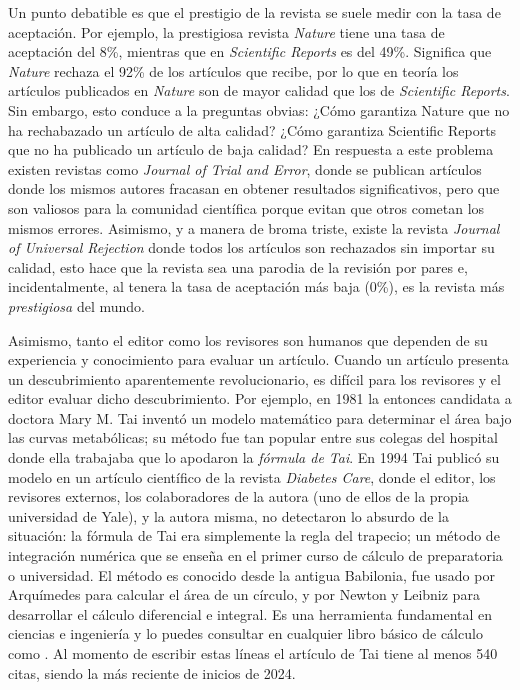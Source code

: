 Un punto debatible es que el prestigio de la revista se suele medir con la tasa
de aceptación.
Por ejemplo, la prestigiosa revista \emph{Nature} tiene una tasa de aceptación
del 8\%, mientras que en \emph{Scientific Reports} es del 49\%.
Significa que \emph{Nature} rechaza el 92\% de los artículos que recibe, por lo
que en teoría los artículos publicados en \emph{Nature} son de mayor calidad que
los de \emph{Scientific Reports}.
Sin embargo, esto conduce a la preguntas obvias:
¿Cómo garantiza Nature que no ha rechabazado un artículo de alta calidad?
¿Cómo garantiza Scientific Reports que no ha publicado un artículo de baja
calidad?
En respuesta a este problema existen revistas como \emph{Journal of Trial and
    Error}, donde se publican
artículos donde los mismos autores fracasan en obtener resultados
significativos, pero que son valiosos para la comunidad científica porque evitan
que otros cometan los mismos errores.
Asimismo, y a manera de broma triste, existe la revista \emph{Journal of
    Universal Rejection} donde todos
los artículos son rechazados sin importar su calidad, esto hace que la revista
sea una parodia de la revisión por pares e, incidentalmente, al tenera la tasa
de aceptación más baja (0\%), es la revista más \emph{prestigiosa} del mundo.

Asimismo, tanto el editor como los revisores son humanos que dependen de su
experiencia y conocimiento para evaluar un artículo.
Cuando un artículo presenta un descubrimiento aparentemente revolucionario, es
difícil para los revisores y el editor evaluar dicho descubrimiento.
Por ejemplo, en 1981 la entonces candidata a doctora Mary M. Tai inventó un
modelo matemático para determinar el área bajo las curvas metabólicas; su método
fue tan popular entre sus colegas del hospital donde ella trabajaba que lo
apodaron la \emph{fórmula de Tai}.
En 1994 Tai publicó su modelo en un artículo científico de la revista
\emph{Diabetes Care}\cite{Tai1994}, donde el editor, los revisores externos,
los colaboradores de la autora (uno de ellos de la propia universidad de Yale),
y la autora misma, no detectaron lo absurdo de la situación: la fórmula de Tai
era simplemente la regla del trapecio; un método de integración numérica que se
enseña en el primer curso de cálculo de preparatoria o universidad.
El método es conocido desde la antigua Babilonia, fue usado por Arquímedes para
calcular el área de un círculo, y por Newton y Leibniz para desarrollar el
cálculo diferencial e integral.
Es una herramienta fundamental en ciencias e ingeniería y lo puedes consultar en
cualquier libro básico de cálculo como \cite{Arizmendi2018}.
Al momento de escribir estas líneas el artículo de Tai tiene al menos 540 citas,
siendo la más reciente de inicios de 2024.


